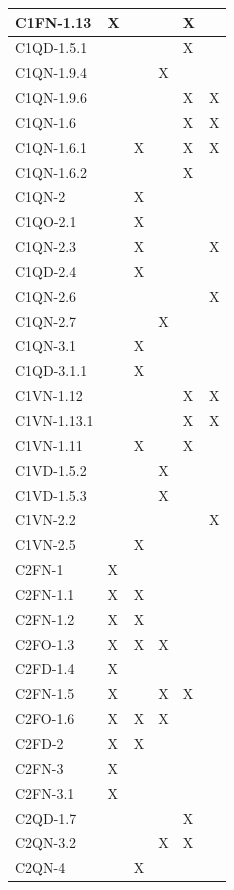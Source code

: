 \begin{longtable}{|p{}|p{}|p{}|p{}|p{}|p{}|}
 C1FN-1.13& X&  &  &  X&  \\ \hline
 C1QD-1.5.1& &  &  &  X&  \\ \hline
 C1QN-1.9.4& &  &  X&  &  \\ \hline
 C1QN-1.9.6& &  &  &  X&  X\\ \hline
 C1QN-1.6& &  &  &  X&  X\\ \hline
 C1QN-1.6.1& &  X&  &  X&  X\\ \hline
 C1QN-1.6.2& &  &  &  X&  \\ \hline
 C1QN-2& &  X&  &  &  \\ \hline
 C1QO-2.1& &  X&  &  &  \\ \hline
 C1QN-2.3& &  X&  &  &  X\\ \hline
 C1QD-2.4& &  X&  &  &  \\ \hline
 C1QN-2.6& &  &  &  &  X\\ \hline
 C1QN-2.7& &  &  X&  &  \\ \hline
 C1QN-3.1& &  X&  &  &  \\ \hline
 C1QD-3.1.1& &  X&  &  &  \\ \hline
 C1VN-1.12& &  &  &  X&  X\\ \hline
 C1VN-1.13.1& &  &  &  X&  X\\ \hline
 C1VN-1.11& &  X&  &  X&  \\ \hline
 C1VD-1.5.2& &  &  X&  &  \\ \hline
 C1VD-1.5.3& &  &  X&  &  \\ \hline
 C1VN-2.2& &  &  &  &  X\\ \hline
 C1VN-2.5& &  X&  &  &  \\ \hline
 C2FN-1& X&  &  &  &  \\ \hline
 C2FN-1.1& X&  X&  &  &  \\ \hline
 C2FN-1.2& X&  X&  &  &  \\ \hline
 C2FO-1.3& X&  X&  X&  &  \\ \hline
 C2FD-1.4& X&  &  &  &  \\ \hline
 C2FN-1.5& X&  &  X&  X&  \\ \hline
 C2FO-1.6& X&  X&  X&  &  \\ \hline
 C2FD-2& X&  X&  &  &  \\ \hline
 C2FN-3& X&  &  &  &  \\ \hline
 C2FN-3.1& X&  &  &  &  \\ \hline
 C2QD-1.7& &  &  &  X&  \\ \hline
 C2QN-3.2& &  &  X&  X&  \\ \hline
 C2QN-4& &  X&  &  &  \\ \hline

\end{longtable}
